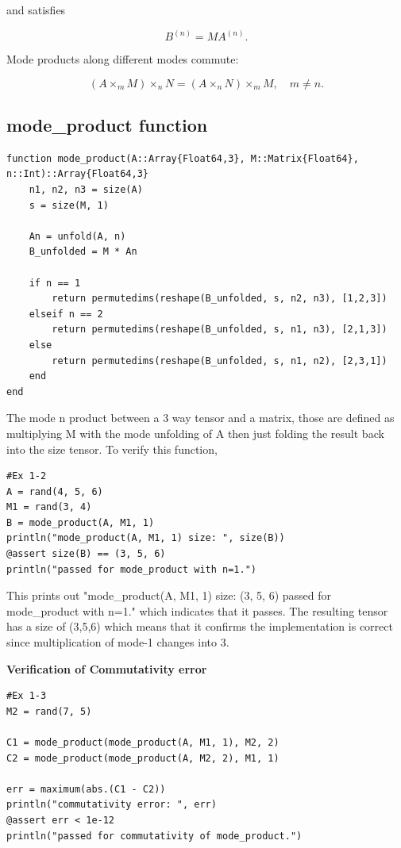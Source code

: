 \documentclass[11pt]{report}
\begin{document}
and satisfies


\[
B^{(n)} = M A^{(n)}.
\]


Mode products along different modes commute:


\[
(A \times_m M) \times_n N = (A \times_n N) \times_m M,\quad m\neq n.
\]

\subsection{mode\_product function}

\begin{lstlisting}
function mode_product(A::Array{Float64,3}, M::Matrix{Float64}, n::Int)::Array{Float64,3}
    n1, n2, n3 = size(A)
    s = size(M, 1)
    
    An = unfold(A, n)
    B_unfolded = M * An
    
    if n == 1
        return permutedims(reshape(B_unfolded, s, n2, n3), [1,2,3])
    elseif n == 2
        return permutedims(reshape(B_unfolded, s, n1, n3), [2,1,3])
    else
        return permutedims(reshape(B_unfolded, s, n1, n2), [2,3,1])
    end
end
\end{lstlisting}

The mode n product between a 3 way tensor and a matrix, those are defined as multiplying M with the mode unfolding of A then just folding the result back into the size tensor.
To verify this function,

\begin{lstlisting}
#Ex 1-2
A = rand(4, 5, 6)
M1 = rand(3, 4)
B = mode_product(A, M1, 1)
println("mode_product(A, M1, 1) size: ", size(B))
@assert size(B) == (3, 5, 6)
println("passed for mode_product with n=1.")
\end{lstlisting}

This prints out
"mode\_product(A, M1, 1) size: (3, 5, 6)
passed for mode\_product with n=1." which indicates that it passes. The resulting tensor has a size of (3,5,6) which means that it confirms the implementation is correct since multiplication of mode-1 changes into 3. 


\textbf{Verification of Commutativity error}

\begin{lstlisting}
#Ex 1-3
M2 = rand(7, 5)

C1 = mode_product(mode_product(A, M1, 1), M2, 2)
C2 = mode_product(mode_product(A, M2, 2), M1, 1)

err = maximum(abs.(C1 - C2))
println("commutativity error: ", err)
@assert err < 1e-12
println("passed for commutativity of mode_product.")
\end{lstlisting}
\end{document}
